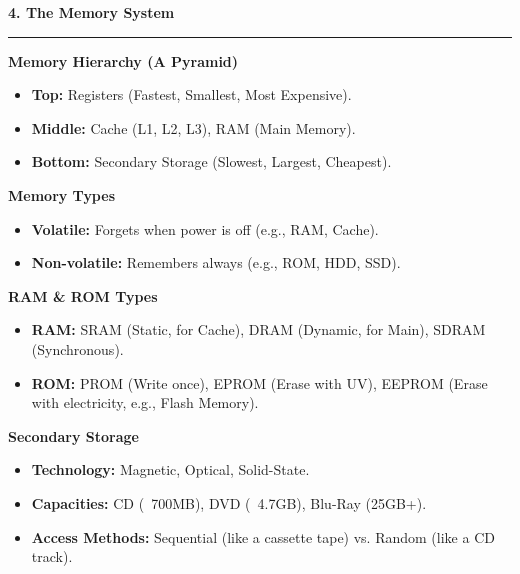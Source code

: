\documentclass[a4paper, 8pt]{extarticle}
\newcommand{\sectionheading}[1]{\large\textbf{#1}\par\noindent\rule{\linewidth}{0.4pt}}
\newcommand{\subsectionheading}[1]{\normalsize\textbf{#1}}
\begin{document}
\begin{multicols}{2}
\vspace{1em}
\sectionheading{4. The Memory System}
\vspace{0.5em}
\subsectionheading{Memory Hierarchy (A Pyramid)}
\begin{itemize}
    \item \textbf{Top:} Registers (Fastest, Smallest, Most Expensive).
    \item \textbf{Middle:} Cache (L1, L2, L3), RAM (Main Memory).
    \item \textbf{Bottom:} Secondary Storage (Slowest, Largest, Cheapest).
\end{itemize}
\subsectionheading{Memory Types}
\begin{itemize}
    \item \textbf{Volatile:} Forgets when power is off (e.g., RAM, Cache).
    \item \textbf{Non-volatile:} Remembers always (e.g., ROM, HDD, SSD).
\end{itemize}
\subsectionheading{RAM \& ROM Types}
\begin{itemize}
    \item \textbf{RAM:} SRAM (Static, for Cache), DRAM (Dynamic, for Main), SDRAM (Synchronous).
    \item \textbf{ROM:} PROM (Write once), EPROM (Erase with UV), EEPROM (Erase with electricity, e.g., Flash Memory).
\end{itemize}
\subsectionheading{Secondary Storage}
\begin{itemize}
    \item \textbf{Technology:} Magnetic, Optical, Solid-State.
    \item \textbf{Capacities:} CD (~700MB), DVD (~4.7GB), Blu-Ray (25GB+).
    \item \textbf{Access Methods:} Sequential (like a cassette tape) vs. Random (like a CD track).
\end{itemize}

\end{multicols}
\end{document}

